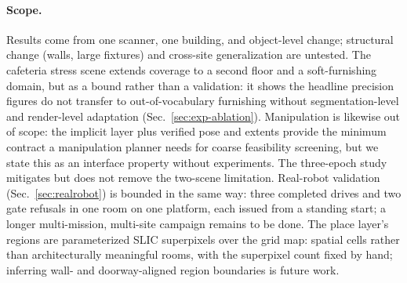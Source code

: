 \paragraph{Scope.}
Results come from one scanner, one building, and object-level change;
structural change (walls, large fixtures) and cross-site generalization are
untested. The cafeteria stress scene extends coverage to a second floor
and a soft-furnishing domain, but as a bound rather than a validation: it
shows the headline precision figures do not transfer to
out-of-vocabulary furnishing without segmentation-level and
render-level adaptation (Sec.~\ref{sec:exp-ablation}). Manipulation is likewise out of scope: the implicit layer plus
verified pose and extents provide the minimum contract a manipulation
planner needs for coarse feasibility screening, but we state this as an
interface property without experiments. The three-epoch study mitigates but does not remove the two-scene
limitation. Real-robot validation (Sec.~\ref{sec:realrobot}) is bounded
in the same way: three completed drives and two gate refusals in one
room on one platform, each issued from a standing start; a longer
multi-mission, multi-site campaign remains to be done. The place layer's regions are parameterized SLIC superpixels over the grid
map: spatial cells rather than architecturally meaningful rooms, with the
superpixel count fixed by hand; inferring wall- and doorway-aligned region
boundaries is future work.

